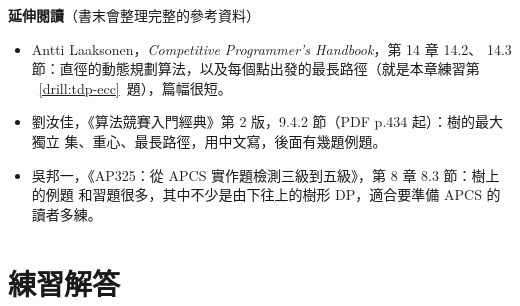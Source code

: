 \textbf{延伸閱讀}（書末會整理完整的參考資料）

\begin{itemize}
\item Antti Laaksonen，\textit{Competitive Programmer's Handbook}，第 14 章 14.2、
14.3 節：直徑的動態規劃算法，以及每個點出發的最長路徑（就是本章練習第
~\ref{drill:tdp-ecc}~題），篇幅很短。
\item 劉汝佳，《算法競賽入門經典》第 2 版，9.4.2 節（PDF p.434 起）：樹的最大獨立
集、重心、最長路徑，用中文寫，後面有幾題例題。
\item 吳邦一，《AP325：從 APCS 實作題檢測三級到五級》，第 8 章 8.3 節：樹上的例題
和習題很多，其中不少是由下往上的樹形 DP，適合要準備 APCS 的讀者多練。
\end{itemize}

\section*{練習解答}

